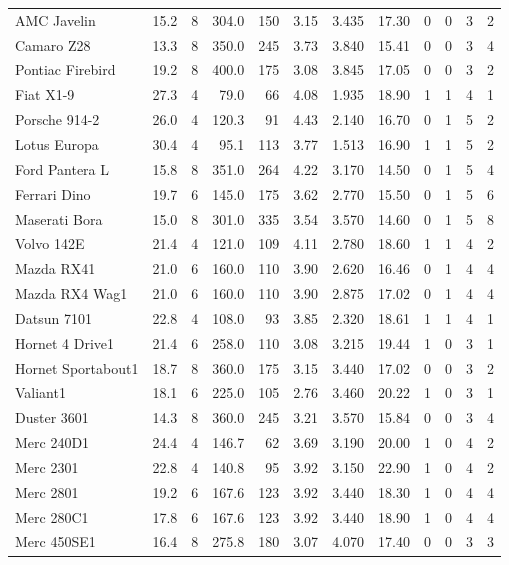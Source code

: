 \documentclass[a4paper, nobind]{templates/ociamthesis}
\begin{document}
\begin{landscape}
\begin{longtable}{lrrrrrrrrrrr}
AMC Javelin & 15.2 & 8 & 304.0 & 150 & 3.15 & 3.435 & 17.30 & 0 & 0 & 3 & 2\\
Camaro Z28 & 13.3 & 8 & 350.0 & 245 & 3.73 & 3.840 & 15.41 & 0 & 0 & 3 & 4\\
Pontiac Firebird & 19.2 & 8 & 400.0 & 175 & 3.08 & 3.845 & 17.05 & 0 & 0 & 3 & 2\\
\addlinespace
Fiat X1-9 & 27.3 & 4 & 79.0 & 66 & 4.08 & 1.935 & 18.90 & 1 & 1 & 4 & 1\\
Porsche 914-2 & 26.0 & 4 & 120.3 & 91 & 4.43 & 2.140 & 16.70 & 0 & 1 & 5 & 2\\
Lotus Europa & 30.4 & 4 & 95.1 & 113 & 3.77 & 1.513 & 16.90 & 1 & 1 & 5 & 2\\
Ford Pantera L & 15.8 & 8 & 351.0 & 264 & 4.22 & 3.170 & 14.50 & 0 & 1 & 5 & 4\\
Ferrari Dino & 19.7 & 6 & 145.0 & 175 & 3.62 & 2.770 & 15.50 & 0 & 1 & 5 & 6\\
\addlinespace
Maserati Bora & 15.0 & 8 & 301.0 & 335 & 3.54 & 3.570 & 14.60 & 0 & 1 & 5 & 8\\
Volvo 142E & 21.4 & 4 & 121.0 & 109 & 4.11 & 2.780 & 18.60 & 1 & 1 & 4 & 2\\
Mazda RX41 & 21.0 & 6 & 160.0 & 110 & 3.90 & 2.620 & 16.46 & 0 & 1 & 4 & 4\\
Mazda RX4 Wag1 & 21.0 & 6 & 160.0 & 110 & 3.90 & 2.875 & 17.02 & 0 & 1 & 4 & 4\\
Datsun 7101 & 22.8 & 4 & 108.0 & 93 & 3.85 & 2.320 & 18.61 & 1 & 1 & 4 & 1\\
\addlinespace
Hornet 4 Drive1 & 21.4 & 6 & 258.0 & 110 & 3.08 & 3.215 & 19.44 & 1 & 0 & 3 & 1\\
Hornet Sportabout1 & 18.7 & 8 & 360.0 & 175 & 3.15 & 3.440 & 17.02 & 0 & 0 & 3 & 2\\
Valiant1 & 18.1 & 6 & 225.0 & 105 & 2.76 & 3.460 & 20.22 & 1 & 0 & 3 & 1\\
Duster 3601 & 14.3 & 8 & 360.0 & 245 & 3.21 & 3.570 & 15.84 & 0 & 0 & 3 & 4\\
Merc 240D1 & 24.4 & 4 & 146.7 & 62 & 3.69 & 3.190 & 20.00 & 1 & 0 & 4 & 2\\
\addlinespace
Merc 2301 & 22.8 & 4 & 140.8 & 95 & 3.92 & 3.150 & 22.90 & 1 & 0 & 4 & 2\\
Merc 2801 & 19.2 & 6 & 167.6 & 123 & 3.92 & 3.440 & 18.30 & 1 & 0 & 4 & 4\\
Merc 280C1 & 17.8 & 6 & 167.6 & 123 & 3.92 & 3.440 & 18.90 & 1 & 0 & 4 & 4\\
Merc 450SE1 & 16.4 & 8 & 275.8 & 180 & 3.07 & 4.070 & 17.40 & 0 & 0 & 3 & 3\\

\end{longtable}
\end{landscape}
\end{document}
